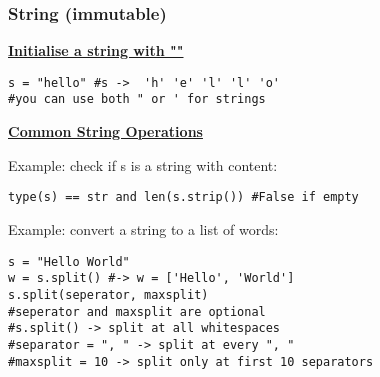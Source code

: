 \subsubsection{String (immutable)}
{\centering\underline{\textbf{Initialise a string with ""}} \par}
\begin{lstlisting}
s = "hello" #s ->  'h' 'e' 'l' 'l' 'o'
#you can use both " or ' for strings 
\end{lstlisting}

{\centering\underline{\textbf{Common String Operations}} \par}

Example: check if s is a string with content:
\begin{lstlisting}
type(s) == str and len(s.strip()) #False if empty
\end{lstlisting}
Example: convert a string to a list of words:
\begin{lstlisting}
s = "Hello World"
w = s.split() #-> w = ['Hello', 'World']
s.split(seperator, maxsplit) 
#seperator and maxsplit are optional
#s.split() -> split at all whitespaces
#separator = ", " -> split at every ", "
#maxsplit = 10 -> split only at first 10 separators
\end{lstlisting}